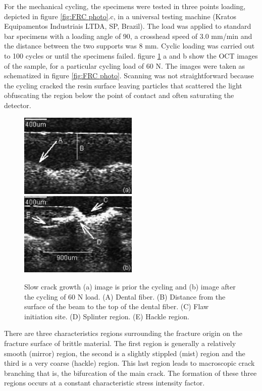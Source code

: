 \documentclass[12pt,twoside,english]{book}
\renewcommand{\~}{\perispomeni}%
\numberwithin{equation}{section}
\numberwithin{figure}{section}
\begin{document}
For the mechanical cycling, the specimens were tested in three points loading, depicted in figure \ref{fig:FRC photo}.c, in a universal testing machine (Kratos Equipamentos Industriais LTDA, SP, Brazil). The load was applied to standard bar specimens with a loading angle of 90\textdegree{}, a crosshead speed of 3.0 mm/min and the distance between the two supports was 8 mm. Cyclic loading was carried out to 100 cycles or until the specimens failed. figure \ref{fig:FRC before and after} a and b show the OCT images of the sample, for a particular cycling load of 60 N. The images were taken as schematized in figure \ref{fig:FRC photo}. Scanning was not straightforward because the cycling cracked the resin surface leaving particles that scattered the light obfuscating the region below the point of contact and often saturating the detector. 
\begin{figure}[h]
\centering{}\includegraphics[height=4cm]{frc-2-a}
\centering{}\includegraphics[height=4cm]{frc-2-b}
\caption{Slow crack growth (a) image is prior the cycling and (b) image after the cycling of 60 N load. (A) Dental fiber. (B) Distance from the surface of the beam to the top of the dental fiber. (C) Flaw initiation site. (D) Splinter region. (E) Hackle region.\label{fig:FRC before and after}}
\end{figure}

There are three characteristics regions surrounding the fracture origin on the fracture surface of brittle material. The first region is generally a relatively smooth (mirror) region, the second is a slightly stippled (mist) region and the third is a very coarse (hackle) region. This last region leads to macroscopic crack branching that is, the bifurcation of the main crack. The formation of these three regions occurs at a constant characteristic stress intensity factor\cite{Mecholsky:1995p2523}. 
\end{document}
